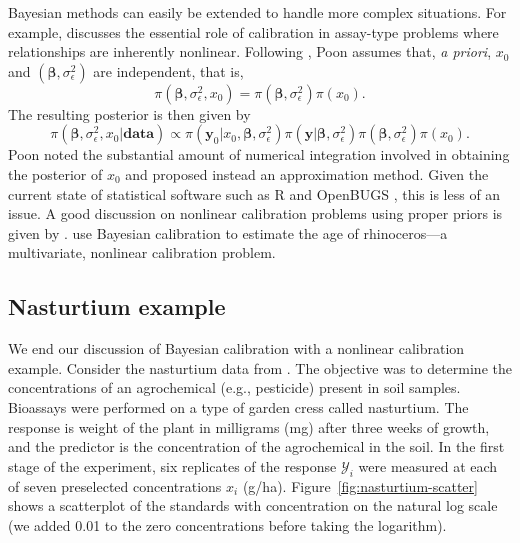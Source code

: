 \documentclass[cmfont,usenames,dvipsnames,leqno]{afit-etd}\usepackage[]{graphicx}\usepackage[]{color}
\newcommand{\mc}[1]{\ensuremath{\mathcal{#1}}}
\begin{document}
Bayesian methods can easily be extended to handle more complex situations. For example, \citet{racine-poon_bayesian_1988} discusses the essential role of calibration in assay-type problems where relationships are inherently nonlinear. Following \citet{hoadley_bayesian_1970}, Poon assumes that, \textit{a priori}, $x_0$ and $(\bm{\beta}, \sigma_\epsilon^2)$ are independent, that is,
\begin{equation*}
  \pi\left(\bm{\beta}, \sigma_\epsilon^2, x_0\right) = \pi\left(\bm{\beta}, \sigma_\epsilon^2\right) \pi\left(x_0\right).
\end{equation*}
The resulting posterior is then given by
\begin{equation*}
  \pi\left(\bm{\beta}, \sigma_\epsilon^2, x_0|\mathbf{data}\right) \propto \pi\left(\bm{y}_0|x_0, \bm{\beta}, \sigma_\epsilon^2\right) \pi\left(\bm{y}|\bm{\beta}, \sigma_\epsilon^2\right) \pi\left(\bm{\beta}, \sigma_\epsilon^2\right) \pi\left(x_0\right).
\end{equation*}
Poon noted the substantial amount of numerical integration involved in obtaining the posterior of $x_0$ and proposed instead an approximation method. Given the current state of statistical software such as R \citep{rprogram} and OpenBUGS \citep{lunn_bugs_2009}, this is less of an issue. A good discussion on nonlinear calibration problems using proper priors is given by \citet{hamada_bayesian_2003}. \citet{plessis_bayesian_1996} use Bayesian calibration to estimate the age of rhinoceros---a multivariate, nonlinear calibration problem. 

\subsection{Nasturtium example}
\label{sec:nasturtium}
We end our discussion of Bayesian calibration with a nonlinear calibration example. Consider the nasturtium data from \citet{racine-poon_bayesian_1988}. The objective was to determine the concentrations of an agrochemical (e.g., pesticide) present in soil samples. Bioassays were performed on a type of garden cress called nasturtium. The response is weight of the plant in milligrams (mg) after three weeks of growth, and the predictor is the concentration of the agrochemical in the soil. In the first stage of the experiment, six replicates of the response $\mc{Y}_i$ were measured at each of seven preselected concentrations $x_i$ (g/ha). Figure~\ref{fig:nasturtium-scatter} shows a scatterplot of the standards with concentration on the natural log scale (we added 0.01 to the zero concentrations before taking the logarithm). 
\end{document}
